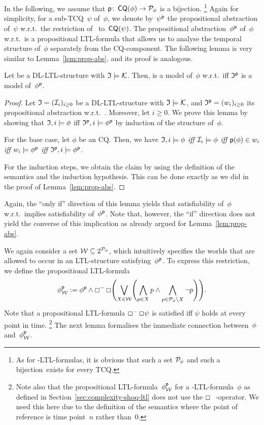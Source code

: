 \noindent
In the following, we assume that $\mathsf{p}\colon\operatorname{\mathsf{CQ}}(\phi)\to\mathcal{P}_\phi$ is a
bijection.%
\footnote{As for \SHOQ-LTL-formulas, it is obvious that such a set $\mathcal{P}_\phi$
    and such a bijection~\psf exists for every TCQ\@.}
%
Again for simplicity, for a sub-TCQ~$\psi$ of~$\phi$, we denote by~$\psi^\mathsf{p}$
the propositional abstraction of~$\psi$ w.r.t.\ the restriction of~\psf
to~$\operatorname{\mathsf{CQ}}(\psi)$.
%
The propositional abstraction~$\phi^\mathsf{p}$ of~$\phi$ w.r.t.~\psf is a
propositional LTL-formula that allows us to analyse the temporal structure
of~$\phi$ separately from the CQ-component.  The following lemma is very similar
to Lemma~\ref{lem:prop-abs}, and its proof is analogous.

\begin{lemma}\label{lem:tcq-prop-abs}
    Let \Imf be a DL-LTL-structure with $\mathfrak{I}\models\mathcal{K}$.  Then, \Imf is a
    model of~$\phi$ w.r.t.~\Kmc iff $\mathfrak{I}^\mathsf{p}$ is a model of~$\phi^\mathsf{p}$.
\end{lemma}

\begin{proof}
    Let $\mathfrak{I}=(\mathcal{I}_i)_{i\ge 0}$ be a DL-LTL-structure with $\mathfrak{I}\models\mathcal{K}$,
    and $\mathfrak{I}^\mathsf{p}=(w_i)_{i\ge 0}$ its propositional abstraction w.r.t.~\psf.
    Moreover, let $i\ge 0$.  We prove this lemma by showing that
    $\mathfrak{I},i\models\phi$ iff $\mathfrak{I}^\mathsf{p},i\models\phi^\mathsf{p}$ by induction of the
    structure of~$\phi$.

    For the base case, let $\phi$ be an CQ\@.  Then, we have
    $\mathfrak{I},i\models\phi$ \emph{iff} $\mathcal{I}_i\models\phi$ \emph{iff}
    $\mathsf{p}(\phi)\in w_i$ \emph{iff} $w_i\models\phi^\mathsf{p}$ \emph{iff}
    $\mathfrak{I}^\mathsf{p},i\models\phi^\mathsf{p}$.

    For the induction steps, we obtain the claim by using the definition of the
    semantics and the induction hypothesis.  This can be done exactly as we did
    in the proof of Lemma~\ref{lem:prop-abs}.
\end{proof}

\noindent
Again, the \enquote{only if} direction of this lemma yields that satisfiability
of~$\phi$ w.r.t.~\Kmc implies satisfiability of~$\phi^\mathsf{p}$.  Note that, however, the
\enquote{if} direction does not yield the converse of this implication as
already argued for Lemma~\ref{lem:prop-abs}.

We again consider
a set $\mathcal{W}\subseteq 2^{\mathcal{P}_\phi}$, which intuitively
specifies the worlds that are allowed to occur in an LTL-structure
satisfying~$\phi^\mathsf{p}$.  To express this restriction, we define the
propositional LTL-formula
\[\phi^\psf_\Wmc:=\phi^\psf\land%
    \Boxm\Box\Biggl(\bigvee_{X\in\Wmc}\Biggl(\bigwedge_{p\in X}p\land%
    \bigwedge_{p\in\Pmc_\phi\setminus X}\lnot p\Biggr)\Biggr).\]
%
Note that a propositional LTL-formula $\Boxm\Box\psi$ is satisfied iff $\psi$
holds at every point in time.%
\footnote{Note also that the propositional LTL-formula~$\phi^\mathsf{p}_\mathcal{W}$ for a
    \SHOQ-LTL-formula~$\phi$ as defined in Section~\ref{sec:complexity-shoq-ltl}
    does not use the $\Boxm$-operator.  We need this here due to the definition of
    the semantics where the point of reference is time point~$n$ rather
    than~$0$.}
%
The next lemma formalises the immediate connection between~$\phi$
and~$\phi^\mathsf{p}_\mathcal{W}$.

